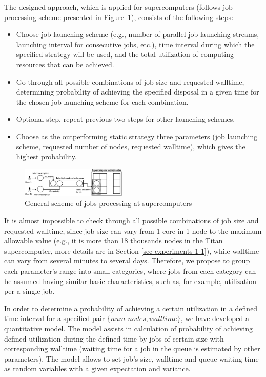 The designed approach, which is applied for supercomputers (follows job processing scheme presented in Figure~\ref{fig-job-processing-general-scheme}), consists of the following steps:
\begin{itemize}
    \item Choose job launching scheme (e.g., number of parallel job launching streams, launching interval for consecutive jobs, etc.), time interval during which the specified strategy will be used, and the total utilization of computing resources that can be achieved.
    \item Go through all possible combinations of job size and requested walltime, determining probability of achieving the specified disposal in a given time for the chosen job launching scheme for each combination.
    \item Optional step, repeat previous two steps for other launching schemes.
    \item Choose as the outperforming static strategy three parameters (job launching scheme, requested number of nodes, requested walltime), which gives the highest probability.
\end{itemize}

\begin{figure}
    \centering
    \includegraphics[width=0.45\textwidth]{pics/job-processing-general-scheme.png}
    \caption{General scheme of jobs processing at supercomputers}
    \label{fig-job-processing-general-scheme} 
\end{figure}

It is almost impossible to check through all possible combinations of job size and requested walltime, since job size can vary from 1 core in 1 node to the maximum allowable value (e.g., it is more than 18 thousands nodes in the Titan supercomputer, more details are in Section \ref{sec-experiments-1-1}), while walltime can vary from several minutes to several days. Therefore, we propose to group each parameter's range into small categories, where jobs from each category can be assumed having similar basic characteristics, such as, for example, utilization per a single job.

In order to determine a probability of achieving a certain utilization in a defined time interval for a specified pair $\{num\_nodes, walltime\}$, we have developed a quantitative model. The model assists in calculation of probability of achieving defined utilization during the defined time by jobs of certain size with corresponding walltime (waiting time for a job in the queue is estimated by other parameters). The model allows to set job's size, walltime and queue waiting time as random variables with a given expectation and variance.

